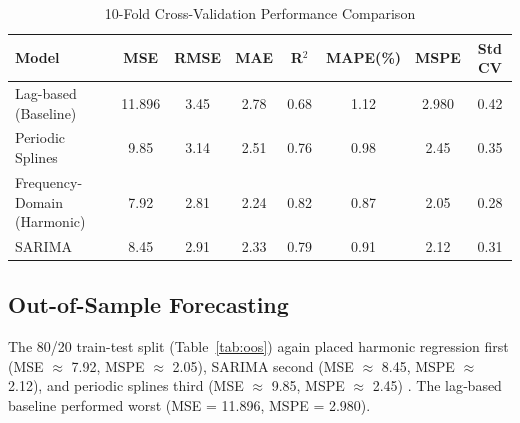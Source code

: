 \documentclass[10pt,twoside]{article}
\numberwithin{equation}{section}
\begin{document}
\begin{table}[htbp]

\centering

\caption{10-Fold Cross-Validation Performance Comparison}

\label{tab:cv}

\begin{tabular}{lccccccc}

\toprule

\textbf{Model} & \textbf{MSE} & \textbf{RMSE} & \textbf{MAE} & \textbf{R$^2$} & \textbf{MAPE(\%)} & \textbf{MSPE} & \textbf{Std CV} \\

\midrule

Lag-based (Baseline) & 11.896 & 3.45 & 2.78 & 0.68 & 1.12 & 2.980 & 0.42 \\

Periodic Splines & 9.85 & 3.14 & 2.51 & 0.76 & 0.98 & 2.45 & 0.35 \\

Frequency-Domain (Harmonic) & 7.92 & 2.81 & 2.24 & 0.82 & 0.87 & 2.05 & 0.28 \\

SARIMA & 8.45 & 2.91 & 2.33 & 0.79 & 0.91 & 2.12 & 0.31 \\

\bottomrule

\end{tabular}

\end{table}



\subsection{Out-of-Sample Forecasting}

The 80/20 train-test split (Table~\ref{tab:oos}) again placed harmonic regression first (MSE $\approx$ 7.92, MSPE $\approx$ 2.05), SARIMA second (MSE $\approx$ 8.45, MSPE $\approx$ 2.12), and periodic splines third (MSE $\approx$ 9.85, MSPE $\approx$ 2.45) \cite{Box2015}. The lag‑based baseline performed worst (MSE = 11.896, MSPE = 2.980).
\end{document}
